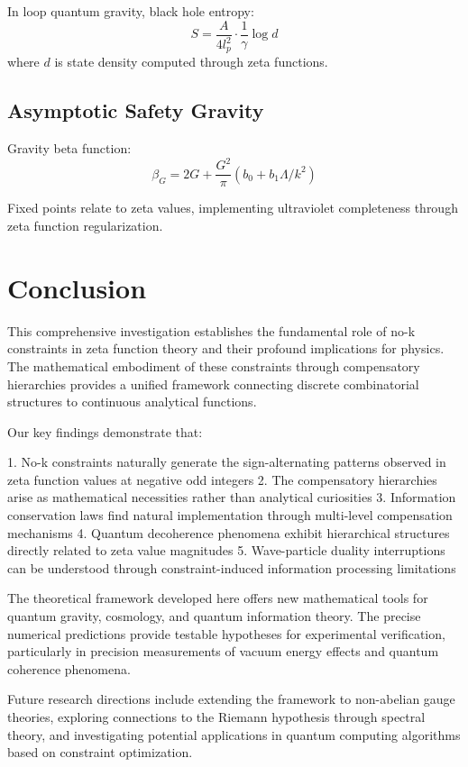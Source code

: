 \documentclass[12pt]{article}
\begin{document}
In loop quantum gravity, black hole entropy:
$$S = \frac{A}{4l_p^2} \cdot \frac{1}{\gamma} \log d$$
where $d$ is state density computed through zeta functions.

\subsection{Asymptotic Safety Gravity}

Gravity beta function:
$$\beta_G = 2G + \frac{G^2}{\pi} \left(b_0 + b_1 \Lambda/k^2\right)$$

Fixed points relate to zeta values, implementing ultraviolet completeness through zeta function regularization.

\section{Conclusion}

This comprehensive investigation establishes the fundamental role of no-k constraints in zeta function theory and their profound implications for physics. The mathematical embodiment of these constraints through compensatory hierarchies provides a unified framework connecting discrete combinatorial structures to continuous analytical functions.

Our key findings demonstrate that:

1. No-k constraints naturally generate the sign-alternating patterns observed in zeta function values at negative odd integers
2. The compensatory hierarchies arise as mathematical necessities rather than analytical curiosities
3. Information conservation laws find natural implementation through multi-level compensation mechanisms
4. Quantum decoherence phenomena exhibit hierarchical structures directly related to zeta value magnitudes
5. Wave-particle duality interruptions can be understood through constraint-induced information processing limitations

The theoretical framework developed here offers new mathematical tools for quantum gravity, cosmology, and quantum information theory. The precise numerical predictions provide testable hypotheses for experimental verification, particularly in precision measurements of vacuum energy effects and quantum coherence phenomena.

Future research directions include extending the framework to non-abelian gauge theories, exploring connections to the Riemann hypothesis through spectral theory, and investigating potential applications in quantum computing algorithms based on constraint optimization.
\end{document}
